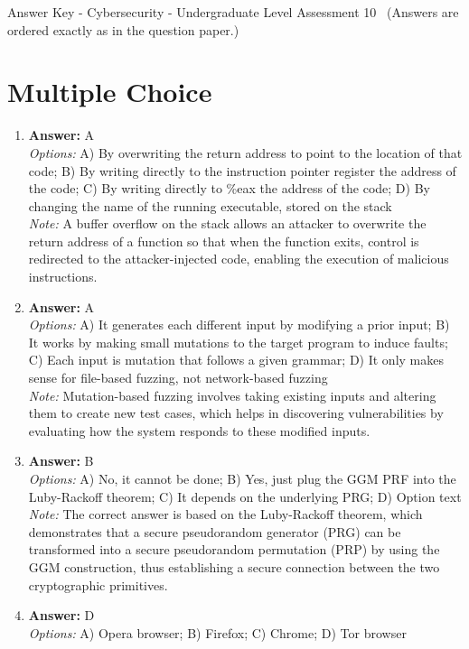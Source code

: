 \documentclass[12pt]{article}
\begin{document}
\begin{center}
Answer Key - Cybersecurity - Undergraduate Level Assessment 10 \
\small (Answers are ordered exactly as in the question paper.)
\end{center}

\section*{Multiple Choice}
\begin{enumerate}[label=\arabic*.]
\item \textbf{Answer:} A
\\ \textit{Options:} A) By overwriting the return address to point to the location of that code; B) By writing directly to the instruction pointer register the address of the code; C) By writing directly to \%eax the address of the code; D) By changing the name of the running executable, stored on the stack
\\ \textit{Note:} A buffer overflow on the stack allows an attacker to overwrite the return address of a function so that when the function exits, control is redirected to the attacker-injected code, enabling the execution of malicious instructions.
\item \textbf{Answer:} A
\\ \textit{Options:} A) It generates each different input by modifying a prior input; B) It works by making small mutations to the target program to induce faults; C) Each input is mutation that follows a given grammar; D) It only makes sense for file-based fuzzing, not network-based fuzzing
\\ \textit{Note:} Mutation-based fuzzing involves taking existing inputs and altering them to create new test cases, which helps in discovering vulnerabilities by evaluating how the system responds to these modified inputs.
\item \textbf{Answer:} B
\\ \textit{Options:} A) No, it cannot be done; B) Yes, just plug the GGM PRF into the Luby-Rackoff theorem; C) It depends on the underlying PRG; D) Option text
\\ \textit{Note:} The correct answer is based on the Luby-Rackoff theorem, which demonstrates that a secure pseudorandom generator (PRG) can be transformed into a secure pseudorandom permutation (PRP) by using the GGM construction, thus establishing a secure connection between the two cryptographic primitives.
\item \textbf{Answer:} D
\\ \textit{Options:} A) Opera browser; B) Firefox; C) Chrome; D) Tor browser

\end{enumerate}
\end{document}

